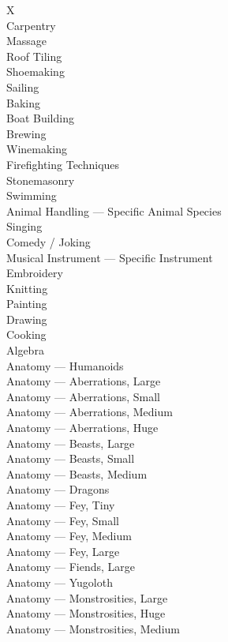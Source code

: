 \documentclass[twocolumn]{dndbook}
\begin{document}
\begin{DndTable}[header=Specializations]{X}
	\\	Carpentry
	\\	Massage
	\\	Roof Tiling
	\\	Shoemaking
	\\	Sailing
	\\	Baking
	\\	Boat Building
	\\ 	Brewing
	\\	Winemaking
	\\	Firefighting Techniques
	\\	Stonemasonry
	\\	Swimming
	\\	Animal Handling --- Specific Animal Species
	\\	Singing
	\\	Comedy / Joking
	\\	Musical Instrument --- Specific Instrument
	\\	Embroidery
	\\	Knitting
	\\	Painting
	\\	Drawing
	\\	Cooking
	\\	Algebra
	\\	Anatomy --- Humanoids
	\\	Anatomy --- Aberrations, Large
	\\	Anatomy --- Aberrations, Small
	\\	Anatomy --- Aberrations, Medium
	\\	Anatomy --- Aberrations, Huge
	\\	Anatomy --- Beasts, Large
	\\	Anatomy --- Beasts, Small
	\\	Anatomy --- Beasts, Medium
	\\	Anatomy --- Dragons
	\\	Anatomy --- Fey, Tiny
	\\	Anatomy --- Fey, Small
	\\	Anatomy --- Fey, Medium
	\\	Anatomy --- Fey, Large
	\\	Anatomy --- Fiends, Large
	\\	Anatomy --- Yugoloth
	\\	Anatomy --- Monstrosities, Large
	\\	Anatomy --- Monstrosities, Huge
	\\	Anatomy --- Monstrosities, Medium

\end{DndTable}
\end{document}
